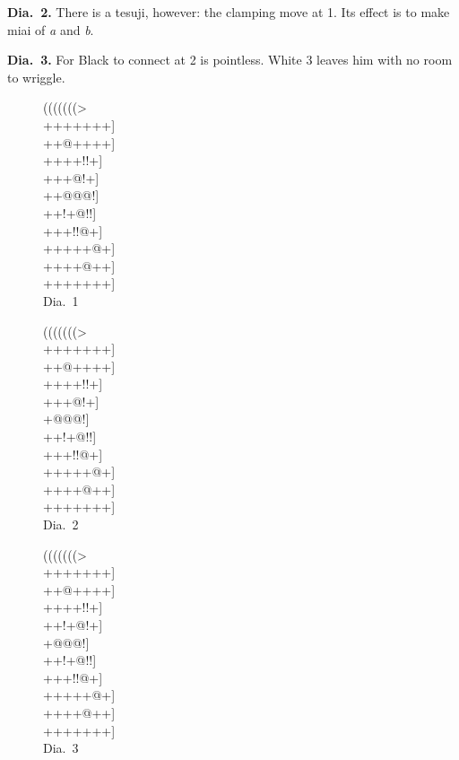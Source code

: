 \documentclass[mcrownvopaper,10pt,twopage,onecolumn,draft,showtrims]{memoir}
\begin{document}
\noindent
\textbf{Dia.\ 2.} There is a tesuji, however: the clamping move at 1. Its effect is
to make miai of \textit{a} and \textit{b}.

\noindent
\textbf{Dia.\ 3.} For Black to connect at 2 is pointless. White 3 leaves him with
no room to wriggle.
\begin{figure}[ht]
    \begin{minipage}[c]{0.33\linewidth}
        \centering    
        {\gnos%
        (((((((>\\
        +++++++]\\
        ++@++++]\\
        ++++!!+]\\
        +++@!+]\\
        ++@@@!]\\
        ++!+@!!]\\
        +++!!@+]\\
        +++++@+]\\
        ++++@++]\\
        +++++++]\\
        }
        Dia.\ 1
    \end{minipage}%
    \begin{minipage}[c]{0.34\linewidth}
        \centering    
        {\gnos%
        (((((((>\\
        +++++++]\\
        ++@++++]\\
        ++++!!+]\\
        ++{\gnosw{}}+@!+]\\
        +@@@!]\\
        ++!+@!!]\\
        +++!!@+]\\
        +++++@+]\\
        ++++@++]\\
        +++++++]\\
        }
        Dia.\ 2
    \end{minipage}%
    \begin{minipage}[c]{0.33\linewidth}
        \centering    
        {\gnos%
        (((((((>\\
        +++++++]\\
        ++@++++]\\
        ++++!!+]\\
        ++!+@!+]\\
        +{\gnosw{}}@{\gnosb{}}@@!]\\
        ++!+@!!]\\
        +++!!@+]\\
        +++++@+]\\
        ++++@++]\\
        +++++++]\\
        }
        Dia.\ 3
    \end{minipage}%
\end{figure}
\end{document}
